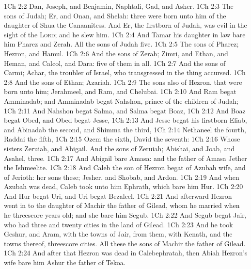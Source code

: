 \vs 1Ch 2:2 Dan, Joseph, and Benjamin, Naphtali, Gad, and Asher.
\vs 1Ch 2:3 The sons of Judah; Er, and Onan, and Shelah:  three were born unto him of the daughter of Shua the Canaanitess. And Er, the firstborn of Judah, was evil in the sight of the \textsc{Lord}; and he slew him.
\vs 1Ch 2:4 And Tamar his daughter in law bare him Pharez and Zerah. All the sons of Judah  five.
\vs 1Ch 2:5 The sons of Pharez; Hezron, and Hamul.
\vs 1Ch 2:6 And the sons of Zerah; Zimri, and Ethan, and Heman, and Calcol, and Dara: five of them in all.
\vs 1Ch 2:7 And the sons of Carmi; Achar, the troubler of Israel, who transgressed in the thing accursed.
\vs 1Ch 2:8 And the sons of Ethan; Azariah.
\vs 1Ch 2:9 The sons also of Hezron, that were born unto him; Jerahmeel, and Ram, and Chelubai.
\vs 1Ch 2:10 And Ram begat Amminadab; and Amminadab begat Nahshon, prince of the children of Judah;
\vs 1Ch 2:11 And Nahshon begat Salma, and Salma begat Boaz,
\vs 1Ch 2:12 And Boaz begat Obed, and Obed begat Jesse,
\vs 1Ch 2:13 And Jesse begat his firstborn Eliab, and Abinadab the second, and Shimma the third,
\vs 1Ch 2:14 Nethaneel the fourth, Raddai the fifth,
\vs 1Ch 2:15 Ozem the sixth, David the seventh:
\vs 1Ch 2:16 Whose sisters  Zeruiah, and Abigail. And the sons of Zeruiah; Abishai, and Joab, and Asahel, three.
\vs 1Ch 2:17 And Abigail bare Amasa: and the father of Amasa  Jether the Ishmeelite.
\vs 1Ch 2:18 And Caleb the son of Hezron begat  of Azubah  wife, and of Jerioth: her sons  these; Jesher, and Shobab, and Ardon.
\vs 1Ch 2:19 And when Azubah was dead, Caleb took unto him Ephrath, which bare him Hur.
\vs 1Ch 2:20 And Hur begat Uri, and Uri begat Bezaleel.
\vs 1Ch 2:21 And afterward Hezron went in to the daughter of Machir the father of Gilead, whom he married when he  threescore years old; and she bare him Segub.
\vs 1Ch 2:22 And Segub begat Jair, who had three and twenty cities in the land of Gilead.
\vs 1Ch 2:23 And he took Geshur, and Aram, with the towns of Jair, from them, with Kenath, and the towns thereof,  threescore cities. All these  the sons of Machir the father of Gilead.
\vs 1Ch 2:24 And after that Hezron was dead in Calebephratah, then Abiah Hezron's wife bare him Ashur the father of Tekoa.
